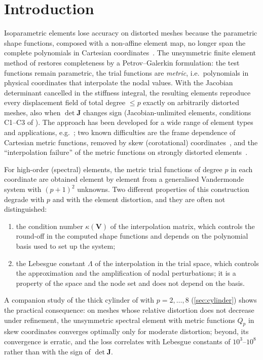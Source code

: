 \section{Introduction}\label{sec:intro}
Isoparametric elements lose accuracy on distorted meshes because the parametric shape
functions, composed with a non-affine element map, no longer span the complete polynomials
in Cartesian coordinates~\cite{Lee1993effects,Arnold2002Approximation}. The unsymmetric
finite element method of \citet{Rajendran2003novel} restores completeness by a
Petrov--Galerkin formulation: the test functions remain parametric, the trial functions are
\emph{metric}, i.e.\ polynomials in physical coordinates that interpolate the nodal values.
With the Jacobian determinant cancelled in the stiffness integral, the resulting elements
reproduce every displacement field of total degree $\le p$ exactly on arbitrarily distorted
meshes, also when $\det\bm J$ changes sign (Jacobian-unlimited elements, conditions C1--C3 of
\citet{Rajendran2010technique}). The approach has been developed for a wide range of element
types and applications, e.g.\
\cite{Ooi2004hexahedron,Ooi2007extension,Cen2012shape,Cen2015unsymmetric,Xie2016Modified,Shang2018airy,Huang2022Unsymmetric,Pfefferkorn2021mesh,Pfefferkorn2023hourglassing,Zaehringer2026On};
two known difficulties are the frame dependence of Cartesian metric functions, removed by
skew (corotational) coordinates~\cite{Ooi2008Remedies,Xie2016Modified}, and the
``interpolation failure'' of the metric functions on strongly distorted
elements~\cite{Ooi2008Remedies,Rajendran2010technique}.

For high-order (spectral) elements, the metric trial functions of degree $p$ in each
coordinate are obtained element by element from a generalised Vandermonde system with
$(p+1)^2$ unknowns. Two different properties of this construction degrade with $p$ and with
the element distortion, and they are often not distinguished:
\begin{enumerate}
\item the condition number $\kappa(\bm V)$ of the interpolation matrix, which controls the
  round-off in the computed shape functions and depends on the polynomial basis used to set up
  the system;
\item the Lebesgue constant $\Lambda$ of the interpolation in the trial space, which controls the
  approximation and the amplification of nodal perturbations; it is a property of the space and
  the node set and does not depend on the basis.
\end{enumerate}
A companion study of the thick cylinder of \citet[Sec.~5.9]{Rajendran2010technique} with
$p=2,\dots,8$ (\cref{sec:cylinder}) shows the practical consequence: on meshes whose relative
distortion does not decrease under refinement, the unsymmetric spectral element with metric
functions $Q_p$ in skew coordinates converges optimally only for moderate distortion; beyond, its
convergence is erratic, and the loss correlates with Lebesgue constants of $10^{3}$--$10^{8}$
rather than with the sign of $\det\bm J$.

